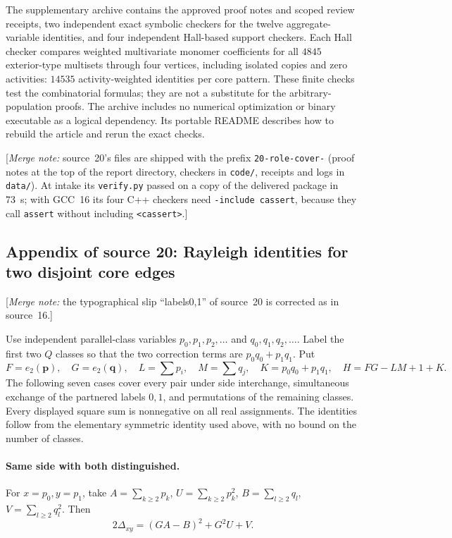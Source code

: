 \documentclass[11pt]{article}
\numberwithin{equation}{section}
\theoremstyle{definition}\newtheorem{definition}[theorem]{Definition}\newtheorem{remark}[theorem]{Remark}
\newcommand{\mnote}[1]{[\textit{Merge note:} #1]}
\begin{document}
The supplementary archive contains the approved proof notes and scoped review receipts, two independent exact symbolic checkers for the twelve aggregate-variable identities, and four independent Hall-based support checkers. Each Hall checker compares weighted multivariate monomer coefficients for all $4845$ exterior-type multisets through four vertices, including isolated copies and zero activities: $14535$ activity-weighted identities per core pattern. These finite checks test the combinatorial formulas; they are not a substitute for the arbitrary-population proofs. The archive includes no numerical optimization or binary executable as a logical dependency. Its portable README describes how to rebuild the article and rerun the exact checks.

\mnote{source~20's files are shipped with the prefix \texttt{20-role-cover-}
(proof notes at the top of the report directory, checkers in
\texttt{code/}, receipts and logs in \texttt{data/}). At intake its
\texttt{verify.py} passed on a copy of the delivered package in 73~s; with
GCC~16 its four C++ checkers need \texttt{-include cassert}, because they
call \texttt{assert} without including \texttt{<cassert>}.}


\subsection{Appendix of source 20: Rayleigh identities for two disjoint core edges}\label{pgr:r:rc:app:disjoint}

\mnote{the typographical slip ``labels0,1'' of source~20 is corrected as in source~16.}

Use independent parallel-class variables $p_0,p_1,p_2,\ldots$ and $q_0,q_1,q_2,\ldots$. Label the first two $Q$ classes so that the two correction terms are $p_0q_0+p_1q_1$. Put
\[
 F=e_2(\mathbf p),\quad G=e_2(\mathbf q),\quad
 L=\sum p_i,\quad M=\sum q_j,\quad K=p_0q_0+p_1q_1,
 \quad H=FG-LM+1+K.
\]
The following seven cases cover every pair under side interchange, simultaneous exchange of the partnered labels $0,1$, and permutations of the remaining classes. Every displayed square sum is nonnegative on all real assignments. The identities follow from the elementary symmetric identity used above, with no bound on the number of classes.

\paragraph{Same side with both distinguished.}
For $x=p_0,y=p_1$, take $A=\sum_{k\ge2}p_k$, $U=\sum_{k\ge2}p_k^2$, $B=\sum_{l\ge2}q_l$, $V=\sum_{l\ge2}q_l^2$. Then
\[
 2\Delta_{xy}=(GA-B)^2+G^2U+V.
\]
\end{document}
